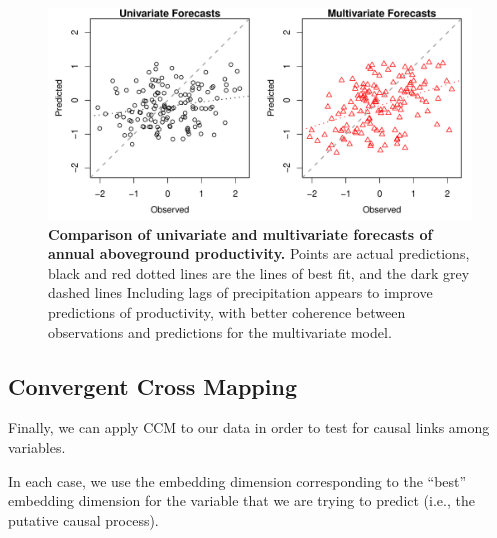 \begin{figure}[!ht]
\begin{center}\includegraphics[width=\maxwidth{\textwidth}]{fig_redm_11.pdf}\end{center}
\caption[Comparison of univariate and multivariate forecasts of annual aboveground productivity.]{\textbf{Comparison of univariate and multivariate forecasts of annual aboveground productivity.}\newline
Points are actual predictions, black and red dotted lines are the lines of best fit, and the dark grey dashed lines Including lags of precipitation appears to improve predictions of productivity, with better coherence between observations and predictions for the multivariate model.}
\end{figure}

\subsection{Convergent Cross Mapping}

Finally, we can apply CCM to our data in order to test for causal links among variables.

In each case, we use the embedding dimension corresponding to the ``best'' embedding dimension for the variable that we are trying to predict (i.e., the putative causal process).

